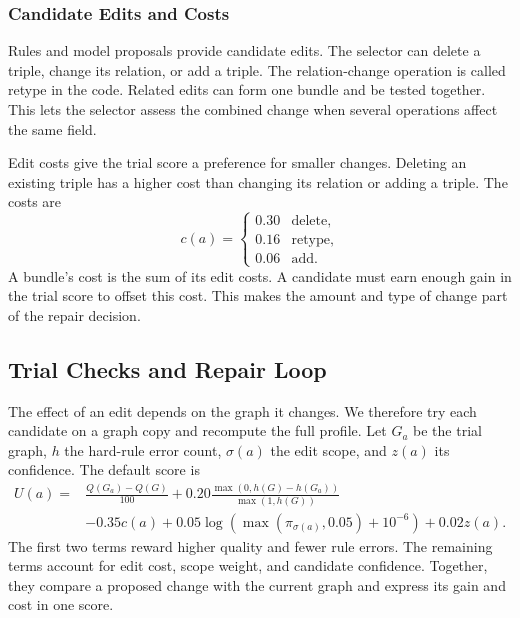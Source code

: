 \subsubsection{Candidate Edits and Costs}
\label{sec:method:modalities}

Rules and model proposals provide candidate edits.
The selector can delete a triple, change its relation, or add a triple.
The relation-change operation is called retype in the code.
Related edits can form one bundle and be tested together.
This lets the selector assess the combined change when several operations
affect the same field.

Edit costs give the trial score a preference for smaller changes.
Deleting an existing triple has a higher cost than changing its relation
or adding a triple. The costs are
\begin{equation}
\label{eq:cost_hierarchy}
c(a)=\begin{cases}
0.30 & \text{delete},\\
0.16 & \text{retype},\\
0.06 & \text{add}.
\end{cases}
\end{equation}
A bundle's cost is the sum of its edit costs.
A candidate must earn enough gain in the trial score to offset this cost.
This makes the amount and type of change part of the repair decision.

\subsection{Trial Checks and Repair Loop}
\label{sec:method:algorithm}

The effect of an edit depends on the graph it changes.
We therefore try each candidate on a graph copy and recompute the full profile.
Let $G_a$ be the trial graph, $h$ the hard-rule error count,
$\sigma(a)$ the edit scope, and $z(a)$ its confidence.
The default score is
\begin{equation}
\label{eq:action_utility}
\begin{split}
U(a)={}&\frac{Q(G_a)-Q(G)}{100}
+0.20\frac{\max(0,h(G)-h(G_a))}{\max(1,h(G))}\\
&-0.35c(a)+0.05\log\!\left(\max(\pi_{\sigma(a)},0.05)+10^{-6}\right)
+0.02z(a).
\end{split}
\end{equation}
The first two terms reward higher quality and fewer rule errors.
The remaining terms account for edit cost, scope weight, and candidate confidence.
Together, they compare a proposed change with the current graph and express
its gain and cost in one score.

